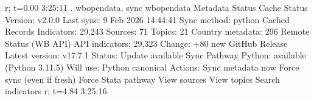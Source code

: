 r; t=0.00 3:25:11
{\smallskip}
. wbopendata, sync
{\smallskip}
wbopendata Metadata Status
{\smallskip}
  Cache Status
  Version:          v2.0.0
  Last sync:        9 Feb 2026 14:44:41
  Sync method:      python
{\smallskip}
  Cached Records
  Indicators:          29,243
  Sources:                 71
  Topics:                  21
  Country metadata:       296
{\smallskip}
  Remote Status (WB API)
  API indicators:      29,323
  Change:           +80 new
{\smallskip}
  GitHub Release
  Latest version:   v17.7.1
  Status:           Update available
{\smallskip}
  Sync Pathway
  Python:           available (Python 3.11.5)
  Will use:         Python canonical
{\smallskip}
{\smallskip}
Actions:
{\smallskip}
    Sync metadata now
    Force sync (even if fresh)
    Force Stata pathway
{\smallskip}
    View sources
    View topics
    Search indicators
{\smallskip}
r; t=4.84 3:25:16
